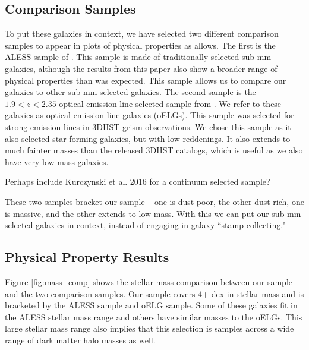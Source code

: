 \documentclass[preprint,natbib209]{aastex}
\begin{document}
\subsection{Comparison Samples}
To put these galaxies in context, we have selected two different comparison samples to appear in plots of physical properties as allows. The first is the ALESS sample of \cite{dacunha15}. This sample is made of traditionally selected sub-mm galaxies, although the results from this paper also show a broader range of physical properties than was expected. This sample allows us to compare our galaxies to other sub-mm selected galaxies.
The second sample is the $1.9 < z < 2.35$ optical emission line selected sample from \cite{zeimann14}. We refer to these galaxies as optical emission line galaxies (oELGs). This sample was selected for strong emission lines in 3DHST grism observations. We chose this sample as it also selected star forming galaxies, but with low reddenings. It also extends to much fainter masses than the released 3DHST catalogs, which is useful as we also have very low mass galaxies. 

Perhaps include Kurczynski et al. 2016 for a continuum selected sample?

These two samples bracket our sample -- one is dust poor, the other dust rich, one is massive, and the other extends to low mass. With this we can put our sub-mm selected galaxies in context, instead of engaging in galaxy ``stamp collecting."

\subsection{Physical Property Results}

Figure \ref{fig:mass_comp} shows the stellar mass comparison between our sample and the two comparison samples. Our sample covers 4+ dex in stellar mass and is bracketed by the ALESS sample and oELG sample. Some of these galaxies fit in the ALESS stellar mass range and others have similar masses to the oELGs. This large stellar mass range also implies that this selection is samples across a wide range of dark matter halo masses as well. 
\end{document}
